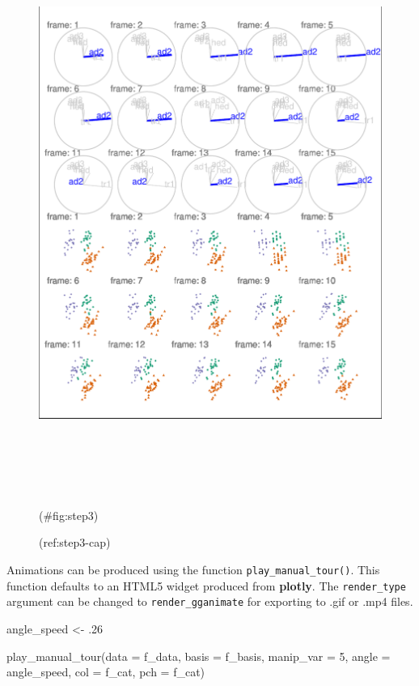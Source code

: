 \begin{Schunk}
\begin{figure}

{\centering \includegraphics[width=6in,height=7.2in]{spinifex_paper_files/figure-latex/step3-1} 

}

\caption[(ref:step3-cap)]{(ref:step3-cap)}(\#fig:step3)
\end{figure}
\end{Schunk}

Animations can be produced using the function \texttt{play\_manual\_tour()}. This function defaults to an HTML5 widget produced from \textbf{plotly}. The \texttt{render\_type} argument can be changed to \texttt{render\_gganimate} for exporting to .gif or .mp4 files.

\begin{Schunk}
\begin{Sinput}
angle_speed <- .26

play_manual_tour(data = f_data,
                 basis = f_basis, 
                 manip_var = 5, 
                 angle = angle_speed,
                 col = f_cat,
                 pch = f_cat)
\end{Sinput}
\end{Schunk}

